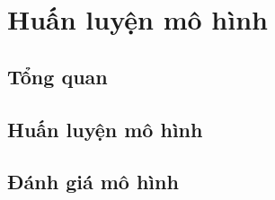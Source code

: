 \section{Huấn luyện mô hình}
\subsection{Tổng quan}
\subsection{Huấn luyện mô hình}
\subsection{Đánh giá mô hình}
